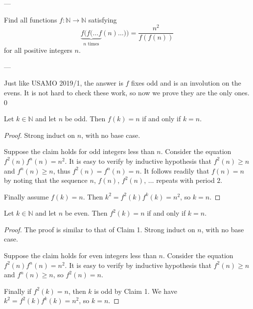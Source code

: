 
---

Find all functions $f:\mathbb N\to\mathbb N$ satisfying \[\underbrace{f(f(\ldots f}_{n\text{ times}}(n)\ldots))=\frac{n^2}{f(f(n))}\]
for all positive integers $n$.

---

Just like USAMO 2019/1, the answer is $f$ fixes odd and is an involution on the evens. It is not hard to check these work, so now we prove they are the only ones.
\setcounter{iclaim}0
\begin{iclaim}
    Let $k\in\mathbb N$ and let $n$ be odd. Then $f(k)=n$ if and only if $k=n$.
\end{iclaim}
\begin{proof}
    Strong induct on $n$, with no base case.

    Suppose the claim holds for odd integers less than $n$. Consider the equation $f^2(n)f^n(n)=n^2$. It is easy to verify by inductive hypothesis that $f^2(n)\ge n$ and $f^n(n)\ge n$, thus $f^2(n)=f^n(n)=n$. It follows readily that $f(n)=n$ by noting that the sequence $n$, $f(n)$, $f^2(n)$, $\ldots$ repeats with period $2$.

    Finally assume $f(k)=n$. Then $k^2=f^2(k)f^k(k)=n^2$, so $k=n$.
\end{proof}
\begin{iclaim}
    Let $k\in\mathbb N$ and let $n$ be even. Then $f^2(k)=n$ if and only if $k=n$.
\end{iclaim}
\begin{proof}
    The proof is similar to that of Claim 1. Strong induct on $n$, with no base case.

    Suppose the claim holds for even integers less than $n$. Consider the equation $f^2(n)f^n(n)=n^2$. It is easy to verify by inductive hypothesis that $f^2(n)\ge n$ and $f^n(n)\ge n$, so $f^2(n)=n$.

    Finally if $f^2(k)=n$, then $k$ is odd by Claim 1. We have $k^2=f^2(k)f^k(k)=n^2$, so $k=n$.
\end{proof}

